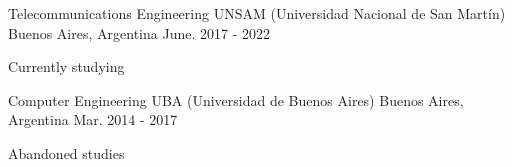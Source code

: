 

\begin{cventries}

  \cventry
    {Telecommunications Engineering} %
    {UNSAM (Universidad Nacional de San Martín)} %
    {Buenos Aires, Argentina} %
    {June. 2017 - 2022} %
    {
      \begin{cvitems} %
        \item {Currently studying}
      \end{cvitems}
    }

  \cventry
  {Computer Engineering} %
  {UBA (Universidad de Buenos Aires)} %
  {Buenos Aires, Argentina} %
  {Mar. 2014 - 2017} %
  {
  \begin{cvitems} %
    \item {Abandoned studies}
  \end{cvitems}
  }
\end{cventries}
